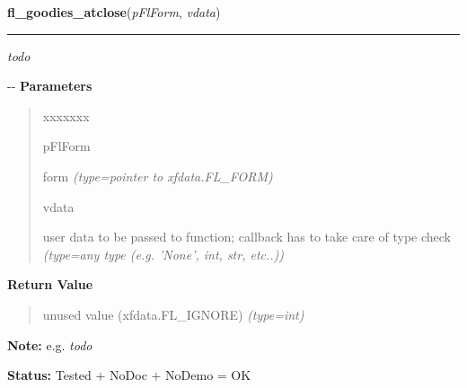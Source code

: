 \hspace{.8\funcindent}\begin{boxedminipage}{\funcwidth}

    \raggedright \textbf{fl\_goodies\_atclose}(\textit{pFlForm}, \textit{vdata})

    \vspace{-1.5ex}

    \rule{\textwidth}{0.5\fboxrule}
\setlength{\parskip}{2ex}

\emph{todo}

-{}-
\setlength{\parskip}{1ex}
      \textbf{Parameters}
      \vspace{-1ex}

      \begin{quote}
        \begin{Ventry}{xxxxxxx}

          \item[pFlForm]


form
            {\it (type=pointer to xfdata.FL\_FORM)}

          \item[vdata]


user data to be passed to function; callback has to take care of
type check
            {\it (type=any type (e.g. 'None', int, str, etc..))}

        \end{Ventry}

      \end{quote}

      \textbf{Return Value}
    \vspace{-1ex}

      \begin{quote}

unused value (xfdata.FL\_IGNORE)
      {\it (type=int)}

      \end{quote}

\textbf{Note:} 
e.g. \emph{todo}


\textbf{Status:} 
Tested + NoDoc + NoDemo = OK


    \end{boxedminipage}

